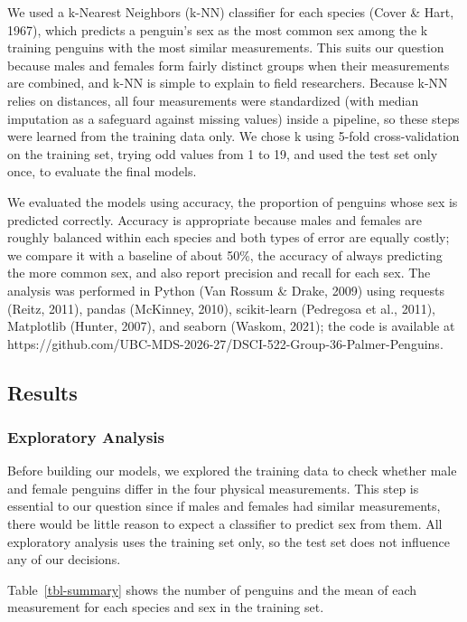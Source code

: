 \documentclass[
  letterpaper,
  DIV=11,
  numbers=noendperiod]{scrartcl}
\begin{document}
We used a k-Nearest Neighbors (k-NN) classifier for each species (Cover
\& Hart, 1967), which predicts a penguin's sex as the most common sex
among the k training penguins with the most similar measurements. This
suits our question because males and females form fairly distinct groups
when their measurements are combined, and k-NN is simple to explain to
field researchers. Because k-NN relies on distances, all four
measurements were standardized (with median imputation as a safeguard
against missing values) inside a pipeline, so these steps were learned
from the training data only. We chose k using 5-fold cross-validation on
the training set, trying odd values from 1 to 19, and used the test set
only once, to evaluate the final models.

We evaluated the models using accuracy, the proportion of penguins whose
sex is predicted correctly. Accuracy is appropriate because males and
females are roughly balanced within each species and both types of error
are equally costly; we compare it with a baseline of about 50\%, the
accuracy of always predicting the more common sex, and also report
precision and recall for each sex. The analysis was performed in Python
(Van Rossum \& Drake, 2009) using requests (Reitz, 2011), pandas
(McKinney, 2010), scikit-learn (Pedregosa et al., 2011), Matplotlib
(Hunter, 2007), and seaborn (Waskom, 2021); the code is available at
https://github.com/UBC-MDS-2026-27/DSCI-522-Group-36-Palmer-Penguins.

\subsection{Results}\label{results}

\subsubsection{Exploratory Analysis}\label{exploratory-analysis}

Before building our models, we explored the training data to check
whether male and female penguins differ in the four physical
measurements. This step is essential to our question since if males and
females had similar measurements, there would be little reason to expect
a classifier to predict sex from them. All exploratory analysis uses the
training set only, so the test set does not influence any of our
decisions.

Table~\ref{tbl-summary} shows the number of penguins and the mean of
each measurement for each species and sex in the training set.
\end{document}
